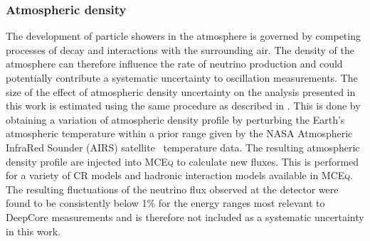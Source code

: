 
\subsubsection{Atmospheric density}

The development of particle showers in the atmosphere is governed by competing processes of decay and interactions with the surrounding air.
The density of the atmosphere can therefore influence the rate of neutrino production and could potentially contribute a systematic uncertainty to oscillation measurements.
The size of the effect of atmospheric density uncertainty on the analysis presented in this work is estimated using the same procedure as described in \cite{MEOWS}.
This is done by obtaining a variation of atmospheric density profile by perturbing the Earth’s atmospheric temperature within a prior range given by the NASA Atmospheric InfraRed Sounder (AIRS) satellite~\cite{AIRS} temperature data.
The resulting atmospheric density profile are injected into \textsc{MCEq} to calculate new fluxes.
This is performed for a variety of CR models and hadronic interaction models available in \textsc{MCEq}.
The resulting fluctuations of the neutrino flux observed at the detector were found to be consistently below 1\% for the energy ranges most relevant to DeepCore measurements and is therefore not included as a systematic uncertainty in this work.



